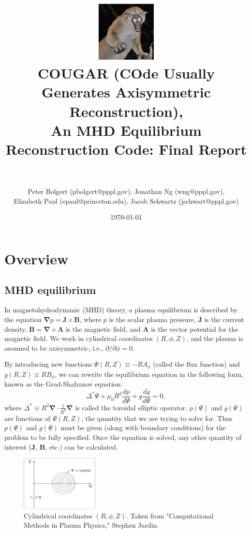 \documentclass[paper=letter, fontsize=11pt]{scrartcl} %
\title{	
\includegraphics[width=3cm]{Cougar_Nevada}
\normalfont \normalsize 
\horrule{0.5pt} \\[0.4cm] %
\LARGE COUGAR (\textbf{CO}de \textbf{U}sually \textbf{G}enerates \textbf{A}xisymmetric \textbf{R}econstruction), \\ \Large An MHD Equilibrium Reconstruction Code: Final Report\\ %
\horrule{2pt} \\[0.5cm] %
}
\author{Peter Bolgert (pbolgert@pppl.gov), Jonathan Ng (wng@pppl.gov), \\ Elizabeth Paul (epaul@princeton.edu), Jacob Schwartz (jschwart@pppl.gov)} %
\date{\normalsize\today} %
\begin{document}
\maketitle %


\section{Overview}

\subsection{MHD equilibrium}

In magnetohydrodynamic (MHD) theory, a plasma equilibrium is described by the equation $\mathbf{\nabla} p = \mathbf{J} \times \mathbf{B}$, where $p$ is the scalar plasma pressure, $\mathbf{J}$ is the current density, $\mathbf{B} = \mathbf{\nabla} \times \mathbf{A}$ is the magnetic field, and $\mathbf{A}$ is the vector potential for the magnetic field.  We work in cylindrical coordinates $(R, \phi, Z)$, and the plasma is assumed to be axisymmetric, i.e., $\partial / \partial \phi = 0$.

By introducing new functions $\Psi(R,Z) \equiv -R A_{\phi}$ (called the flux function) and $g(R,Z) \equiv R B_{\phi}$, we can rewrite the equilibrium equation in the following form, known as the Grad-Shafranov equation:
\begin{equation}
\Delta^{*} \Psi + \mu_0 R^2 \frac{dp}{d\Psi} + g \frac{dg}{d\Psi} = 0,
\end{equation}
where $\Delta^{*} \equiv R^2 \mathbf{\nabla} \cdot \frac{1}{R^2} \mathbf{\nabla}$ is called the toroidal elliptic operator. $p(\Psi)$ and $g(\Psi)$ are functions of $\Psi(R,Z)$, the quantity that we are trying to solve for.  Thus $p(\Psi)$ and $g(\Psi)$ must be given (along with boundary conditions) for the problem to be fully specified.  Once the equation is solved, any other quantity of interest ($\mathbf{J}$, $\mathbf{B}$, etc.) can be calculated.  

\begin{figure}
\centering
\captionsetup{justification=centering,margin=3cm}
\caption[caption]{Cylindrical coordinates $(R,\phi,Z)$.  Taken from "Computational Methods in Plasma Physics," Stephen Jardin.}

\includegraphics[width=0.35\textwidth]{coordinates}

\end{figure}
\end{document}
